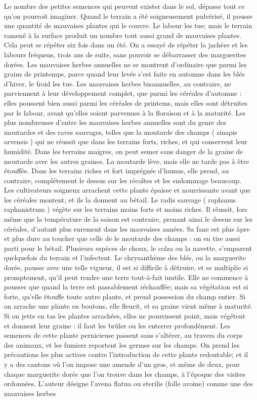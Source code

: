 Le nombre des petites semences qui peuvent exister dans le sol, dépasse tout ce qu'on pourroit imaginer. Quand le terrain a été soigneusement pulvérisé, il pousse une quantité de mauvaises plantes qui le couvre. Le labour les tue; mais le terrain ramené à la surface produit un nombre tout aussi grand de mauvaises plantes. Cela peut se répéter six fois dans un été. On a essayé de répéter la jachère et les labours fréquens, trois ans de suite, sans pouvoir se débarrasser des marguerites dorées.
Les mauvaises herbes annuelles ne se montrent d'ordinaire que parmi les grains de printemps, parce quand leur levée s'est faite en\setcounter{page}{197} automne dans les blés d'hiver, le froid les tue. Les mauvaises herbes bisannuelles, au contraire, ne parviennent à leur développement complet, que parmi les céréales d'automne : elles poussent bien aussi parmi les céréales de printems, mais elles sont détruites par le labour, avant qu'elles soient parvenues à la floraison et à la maturité. Les plus nombreuses d'entre les mauvaises herbes annuelles sont du genre des moutardes et des raves sauvages, telles que la moutarde des champs ( sinapis arvensis ) qui ne réussit que dans les terrains forts, riches, et qui conservent leur humidité. Dans les terrains maigres, on peut semer sans danger de la graine de moutarde avec les autres graines. La moutarde lève, mais elle ne tarde pas à être étouffée. Dans les terrains riches et fort imprégnés d'humus, elle prend, au contraire, complétement le dessus sur les récoltes et les endommage beaucoup. Les cultivateurs soigneux arrachent cette plante épaisse et nourrissante avant que les céréales montent, et ils la donnent au bétail. Le radis sauvage ( raphanus raphanistrum ) végète sur les terrains moins forts et moins riches. Il réussit, lors même que la température de la saison est contraire, prenant ainsi le dessus sur les céréales, d'autant plus surement dans les mauvaises années. Sa fane\setcounter{page}{198} est plus âpre et plus dure au toucher que celle de le moutarde des champs : on en tire aussi parti pour le bétail. Plusieurs espèces de choux, le colza ou la navette, s'emparent quelquefois du terrain et l'infectent. Le chrysanthème des blés, ou la marguerite dorée, pousse avec une telle vigueur, il est si difficile à détruire, et se multiplie si promptement, qu'il peut rendre une terre tout-à-fait inutile. Elle ne commence à pousser que quand la terre est passablement réchauffée; mais sa végétation est si forte, qu'elle étouffe toute autre plante, et prend possession du champ entier. Si on arrache une plante en boutons, elle fleurit, et sa graine vient même à maturité. Si on jette en tas les plantes arrachées, elles ne pourrissent point, mais végétent et donnent leur graine : il faut les brûler ou les enterrer profondément. Les semences de cette plante pernicieuse passent sans s'altérer, au travers du corps des animaux, et les fumiers reportent les germes sur les champs. On prend les précautions les plus actives contre l'introduction de cette plante redoutable; et il y a des cantons où l'on impose une amende d'un gros, et même de deux, pour chaque marguerite dorée que l'on trouve dans les champs, à l'époque des visites ordonnées.\setcounter{page}{199} L'auteur désigne l'avena flatua ou sterilis (folle avoine) comme une des mauvaises herbes 